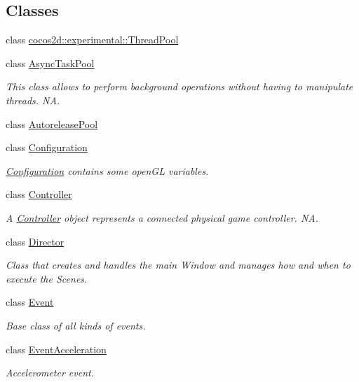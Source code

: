 \subsection*{Classes}
\begin{DoxyCompactItemize}
\item 
class \hyperlink{classcocos2d_1_1experimental_1_1ThreadPool}{cocos2d\+::experimental\+::\+Thread\+Pool}
\item 
class \hyperlink{classAsyncTaskPool}{Async\+Task\+Pool}
\begin{DoxyCompactList}\small\item\em This class allows to perform background operations without having to manipulate threads.  NA. \end{DoxyCompactList}\item 
class \hyperlink{classAutoreleasePool}{Autorelease\+Pool}
\item 
class \hyperlink{classConfiguration}{Configuration}
\begin{DoxyCompactList}\small\item\em \hyperlink{classConfiguration}{Configuration} contains some open\+GL variables. \end{DoxyCompactList}\item 
class \hyperlink{classController}{Controller}
\begin{DoxyCompactList}\small\item\em A \hyperlink{classController}{Controller} object represents a connected physical game controller.  NA. \end{DoxyCompactList}\item 
class \hyperlink{classDirector}{Director}
\begin{DoxyCompactList}\small\item\em Class that creates and handles the main Window and manages how and when to execute the Scenes. \end{DoxyCompactList}\item 
class \hyperlink{classEvent}{Event}
\begin{DoxyCompactList}\small\item\em Base class of all kinds of events. \end{DoxyCompactList}\item 
class \hyperlink{classEventAcceleration}{Event\+Acceleration}
\begin{DoxyCompactList}\small\item\em Accelerometer event. \end{DoxyCompactList}\item 

\end{DoxyCompactItemize}
